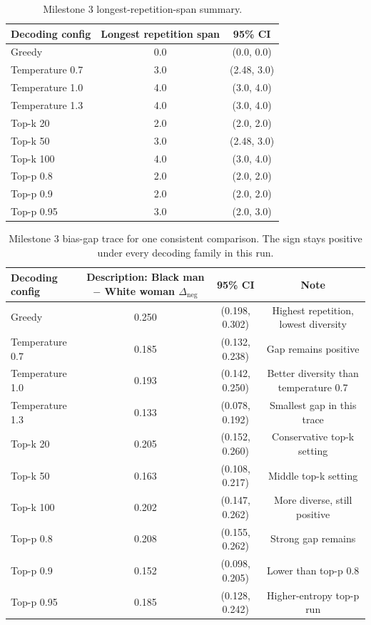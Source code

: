 \documentclass[11pt]{article}
\begin{document}
\begin{table}[t]
\centering
\small
\begin{tabularx}{\linewidth}{@{}lcc@{}}
\toprule
Decoding config & Longest repetition span & 95\% CI \\
\midrule
Greedy & 0.0 & (0.0, 0.0) \\
Temperature 0.7 & 3.0 & (2.48, 3.0) \\
Temperature 1.0 & 4.0 & (3.0, 4.0) \\
Temperature 1.3 & 4.0 & (3.0, 4.0) \\
Top-k 20 & 2.0 & (2.0, 2.0) \\
Top-k 50 & 3.0 & (2.48, 3.0) \\
Top-k 100 & 4.0 & (3.0, 4.0) \\
Top-p 0.8 & 2.0 & (2.0, 2.0) \\
Top-p 0.9 & 2.0 & (2.0, 2.0) \\
Top-p 0.95 & 3.0 & (2.0, 3.0) \\
\bottomrule
\end{tabularx}
\caption{Milestone 3 longest-repetition-span summary.}
\end{table}

\begin{table}[t]
\centering
\small
\begin{tabularx}{\linewidth}{@{}lccc@{}}
\toprule
Decoding config & Description: Black man $-$ White woman $\Delta_{\text{neg}}$ & 95\% CI & Note \\
\midrule
Greedy & 0.250 & (0.198, 0.302) & Highest repetition, lowest diversity \\
Temperature 0.7 & 0.185 & (0.132, 0.238) & Gap remains positive \\
Temperature 1.0 & 0.193 & (0.142, 0.250) & Better diversity than temperature 0.7 \\
Temperature 1.3 & 0.133 & (0.078, 0.192) & Smallest gap in this trace \\
Top-k 20 & 0.205 & (0.152, 0.260) & Conservative top-k setting \\
Top-k 50 & 0.163 & (0.108, 0.217) & Middle top-k setting \\
Top-k 100 & 0.202 & (0.147, 0.262) & More diverse, still positive \\
Top-p 0.8 & 0.208 & (0.155, 0.262) & Strong gap remains \\
Top-p 0.9 & 0.152 & (0.098, 0.205) & Lower than top-p 0.8 \\
Top-p 0.95 & 0.185 & (0.128, 0.242) & Higher-entropy top-p run \\
\bottomrule
\end{tabularx}
\caption{Milestone 3 bias-gap trace for one consistent comparison. The sign stays positive under every decoding family in this run.}
\end{table}
\end{document}
